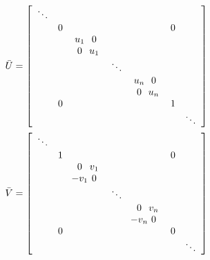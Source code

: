 \begin{align}
\bar{U} & =\left[\begin{array}{rrrrrrr}
\ddots\\
 & 0 &  &  &  & 0\\
 &  & \begin{array}{cc}
\text{\makebox[0pt]{\ensuremath{u_{1}}}} & 0\\
0 & \text{\makebox[0pt]{\ensuremath{u_{1}}}}
\end{array}\\
 &  &  & \ddots\\
 &  &  &  & \begin{array}{cc}
\text{\makebox[0pt]{\ensuremath{u_{n}}}} & 0\\
0 & \text{\makebox[0pt]{\ensuremath{u_{n}}}}
\end{array}\\
 & 0 &  &  &  & 1\\
 &  &  &  &  &  & \ddots
\end{array}\right]\label{eq:form of UV}\\
\bar{V} & =\left[\begin{array}{rrrrrrr}
\ddots\\
 & 1 &  &  &  & 0\\
 &  & \begin{array}{cc}
0 & \text{\makebox[0pt]{\ensuremath{v_{1}}}}\\
\text{\makebox[0pt]{\ensuremath{-v_{1}}}} & 0
\end{array}\\
 &  &  & \ddots\\
 &  &  &  & \begin{array}{cc}
0 & \text{\makebox[0pt]{\ensuremath{v_{n}}}}\\
\text{\makebox[0pt]{\ensuremath{-v_{n}}}} & 0
\end{array}\\
 & 0 &  &  &  & 0\\
 &  &  &  &  &  & \ddots
\end{array}\right]\nonumber 
\end{align}

